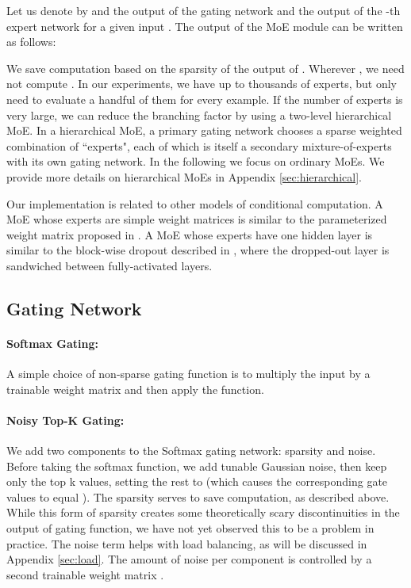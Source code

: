 \documentclass{article} \pdfoutput=1
\begin{document}
Let us denote by  and  the output of the gating network and the output of the -th expert network for a given input . The output  of the MoE module can be written as follows:



We save computation based on the sparsity of the output of .  Wherever , we need not compute .  In our experiments, we have up to thousands of experts, but only need to evaluate a handful of them for every example. If the number of experts is very large, we can reduce the branching factor by using a two-level hierarchical MoE. In a hierarchical MoE, a primary gating network chooses a sparse weighted combination of ``experts", each of which is itself a secondary mixture-of-experts with its own gating network. In the following we focus on ordinary MoEs. We provide more details on hierarchical MoEs in Appendix \ref{sec:hierarchical}.

Our implementation is related to other models of conditional computation. A MoE whose experts are simple weight matrices is similar to the parameterized weight matrix proposed in \citep{Cho14}.  A MoE whose experts have one hidden layer is similar to the block-wise dropout described in \citep{Bengio15:CondComp}, where the dropped-out layer is sandwiched between fully-activated layers.

\subsection{Gating Network}

\paragraph{Softmax Gating:} A simple choice of non-sparse gating function \citep{Jordan1994HME} is to multiply the input by a trainable weight matrix  and then apply the  function.



\paragraph{Noisy Top-K Gating:}\label{sec:noisytopk} We add two components to the Softmax gating network: sparsity and noise.  Before taking the softmax function, we add tunable Gaussian noise, then keep only the top k values, setting the rest to  (which causes the corresponding gate values to equal ).  The sparsity serves to save computation, as described above.  While this form of sparsity creates some theoretically scary discontinuities in the output of gating function, we have not yet observed this to be a problem in practice.  The noise term helps with load balancing, as will be discussed in Appendix \ref{sec:load}.  The amount of noise per component is controlled by a second trainable weight matrix .
\end{document}
